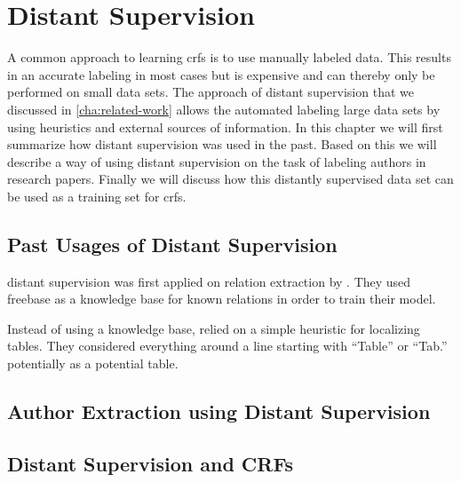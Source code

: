 \chapter{Distant Supervision}\label{cha:distant-supervision}

A common approach to learning \glspl{crf} is to use manually labeled data.
This results in an accurate labeling in most cases but is expensive and can thereby only be performed on small data sets.
The approach of \gls{distant supervision} that we discussed in \cref{cha:related-work} allows the automated labeling large data sets by using heuristics and external sources of information.
In this chapter we will first summarize how \gls{distant supervision} was used in the past. Based on this we will describe a way of using \gls{distant supervision} on the task of labeling authors in research papers. Finally we will discuss how this distantly supervised data set can be used as a training set for \glspl{crf}.\\

\section{Past Usages of Distant Supervision}
\Gls{distant supervision} was first applied on relation extraction by \citet{mintz2009distant}.
They used \gls{freebase} as a knowledge base for known relations in order to train their model.

Instead of using a knowledge base, \citet{fan2015detecting} relied on a simple heuristic for localizing tables.
They considered everything around a line starting with ``Table'' or ``Tab.'' potentially as a potential table.



\section{Author Extraction using Distant Supervision}

\section{Distant Supervision and CRFs}
